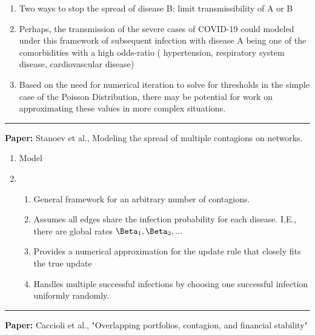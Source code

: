 \documentclass[11pt]{article}
\begin{document}
\begin{enumerate}
\begin{enumerate}
    \end{enumerate}
    \item Two ways to stop the spread of disease B: limit transmissibility of A or B
    \item Perhaps, the transmission of the severe cases of COVID-19 could modeled under this framework of subsequent infection with disease A being one of the comorbidities with a high odds-ratio ( hypertension, respiratory system disease, cardiovascular
    disease)
    \item Based on the need for numerical iteration to solve for thresholds in the simple case of the Poisson Distribution, there may be potential for work on approximating these values in more complex situations. 
    
\end{enumerate}
\smallskip
\rule{\textwidth}{0.01in}

\textbf{Paper: } Stanoev et al., Modeling the spread of multiple contagions on networks.

\begin{enumerate}
    \item Model
    \item \begin{enumerate}
        \item General framework for an arbitrary number of contagions.
        \item Assumes all edges share the infection probability for each disease. I.E., there are global rates $\Beta_{1},\Beta_{2},...$
        \item Provides a numerical approximation for the update rule that closely fits the true update
        \item Handles multiple successful infections by choosing one successful infection uniformly randomly.
    \end{enumerate}
\end{enumerate}

\smallskip
\rule{\textwidth}{0.01in}

\textbf{Paper:} Caccioli et al., "Overlapping portfolios, contagion, and financial stability" 
\end{document}
